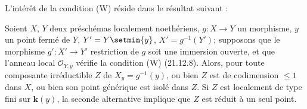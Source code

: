 L'intérêt de la condition (W) réside dans le résultat suivant :

\begin{proposition}[21.12.10]
\label{IV.21.12.10}
Soient $X$, $Y$ deux préschémas localement noethériens, $g:X\to Y$ un morphisme,
$y$ un point fermé de $Y$, $Y'=Y\setmin\{y\}$, $X'=g^{-1}(Y')$; supposons que le morphisme
$g':X'\to Y'$ restriction de $g$ soit une immersion ouverte, et que l'anneau local
$\mathcal O_{Y,y}$ vérifie la condition \textup{(W) (21.12.8)}. Alors, pour toute composante
irréductible $Z$ de $X_y=g^{-1}(y)$, \textup{ou bien} $Z$ est de codimension $\leq1$ dans $X$,
\textup{ou bien} son point générique est isolé dans $Z$. Si $Z$ est localement de type fini sur
$\boldsymbol{k}(y)$, la seconde alternative implique que $Z$ est réduit à un seul point.
\end{proposition}

